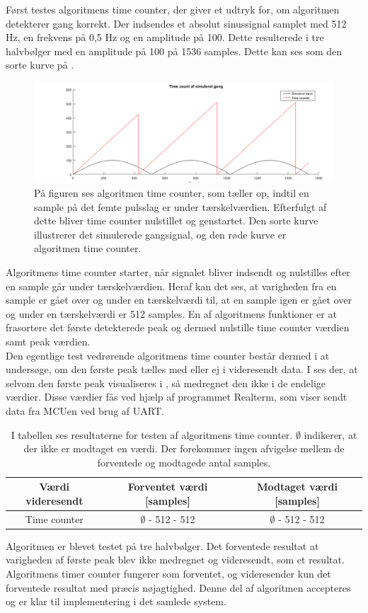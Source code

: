 Først testes algoritmens time counter, der giver et udtryk for, om algoritmen detekterer gang korrekt. Der indsendes et absolut sinussignal samplet med 512 Hz, en frekvens på 0,5 Hz og en amplitude på 100. Dette resulterede i tre halvbølger med en amplitude på 100 på 1536 samples. Dette kan ses som den sorte kurve på .
\begin{figure}[H]
	\centering
	\includegraphics[width=.9\textwidth]{figures/cDesign/test_timecount_gang.png}
	\caption{På figuren ses algoritmen time counter, som tæller op, indtil en sample på det femte pulsslag er under tærskelværdien. Efterfulgt af dette bliver time counter nulstillet og genstartet. Den sorte kurve illustrerer det simulerede gangsignal, og den røde kurve er algoritmen time counter.}
	\label{fig:testgraf_timecounter}
\end{figure}
Algoritmens time counter starter, når signalet bliver indsendt og nulstilles efter en sample går under tærskelværdien. Heraf kan det ses, at varigheden fra en sample er gået over og under en tærskelværdi til, at en sample igen er gået over og under en tærskelværdi er 512 samples. En af algoritmens funktioner er at frasortere det første detekterede peak og dermed nulstille time counter værdien samt peak værdien.\\
Den egentlige test vedrørende algoritmens time counter består dermed i at undersøge, om den første peak tælles med eller ej i videresendt data. I  ses der, at selvom den første peak visualiseres i , så medregnet den ikke i de endelige værdier. Disse værdier fås ved hjælp af programmet Realterm, som viser sendt data fra MCUen ved brug af UART.
\begin{table}[H]
	\centering
	\begin{tabular}{ccc}
		\hline
		\rowcolor[HTML]{C0C0C0} 
		Værdi videresendt & Forventet værdi [samples] & Modtaget værdi [samples] \\ \hline
		Time counter & $\emptyset$ - 512 - 512 & $\emptyset$ - 512 - 512 \\ \hline
	\end{tabular}
	\caption{I tabellen ses resultaterne for testen af algoritmens time counter. $\emptyset$ indikerer, at der ikke er modtaget en værdi. Der forekommer ingen afvigelse mellem de forventede og modtagede antal samples.}
	\label{tab:test_res_timecount}
\end{table} \vspace{-0.5cm}
Algoritmen er blevet testet på tre halvbølger. Det forventede resultat at varigheden af første peak blev ikke medregnet og videresendt, som et resultat. Algoritmens timer counter fungerer som forventet, og videresender kun det forventede resultat med præcis nøjagtighed. Denne del af algoritmen accepteres og er klar til implementering i det samlede system.

